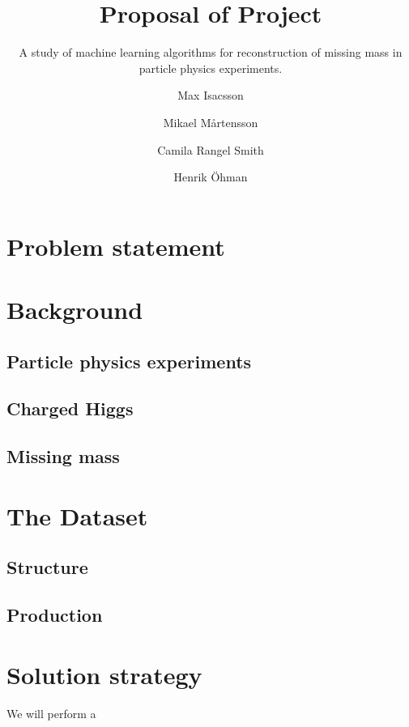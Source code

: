 \documentclass{scrartcl}
\title{Proposal of Project}
\subtitle{A study of machine learning algorithms for reconstruction of missing mass in particle physics experiments.}
\author[1]{Max Isacsson}
\author[2]{Mikael M\aa rtensson}
\author[3]{Camila Rangel Smith}
\author[4]{Henrik \"{O}hman}
\affil[1]{\small\url{max.isacsson@physics.uu.se}}
\affil[2]{\url{mikael.martensson@physics.uu.se}}
\affil[3]{\url{camila.rangel@physics.uu.se}}
\affil[4]{\url{henrik.ohman@physics.uu.se}}
\begin{document}
\maketitle

\section{Problem statement}


\section{Background}
\subsection{Particle physics experiments}

\subsection{Charged Higgs}
\subsection{Missing mass}


\section{The Dataset}
\subsection{Structure}

\subsection{Production}


\section{Solution strategy}
We will perform a 


% 
\end{document}
